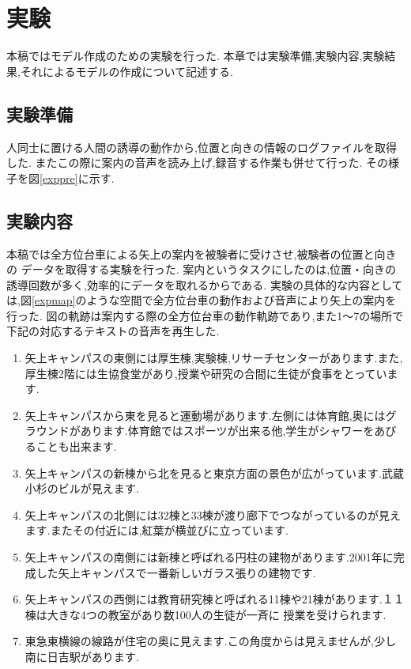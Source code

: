\chapter{実験}
本稿ではモデル作成のための実験を行った.
本章では実験準備,実験内容,実験結果,それによるモデルの作成について記述する.

\section{実験準備}
人同士に置ける人間の誘導の動作から,位置と向きの情報のログファイルを取得した.
またこの際に案内の音声を読み上げ,録音する作業も併せて行った.
その様子を図\ref{exppre}に示す.

\begin{comment}
\begin{figure}[!h]
\begin{center}
\texttt{[image: exppre.eps]}
\caption{実験準備の様子}
\label{exppre}
\end{center}
\end{figure}
\end{comment}

\section{実験内容}
本稿では全方位台車による矢上の案内を被験者に受けさせ,被験者の位置と向きの
データを取得する実験を行った.
案内というタスクにしたのは,位置・向きの誘導回数が多く,効率的にデータを取れるからである.
実験の具体的な内容としては,図\ref{expmap}のような空間で全方位台車の動作および音声により矢上の案内を行った.
図の軌跡は案内する際の全方位台車の動作軌跡であり,また1～7の場所で下記の対応するテキストの音声を再生した.

\begin{enumerate}
\item 矢上キャンパスの東側には厚生棟,実験棟,リサーチセンターがあります.また,厚生棟2階には生協食堂があり,授業や研究の合間に生徒が食事をとっています.
\item 矢上キャンパスから東を見ると運動場があります.左側には体育館,奥にはグラウンドがあります.体育館ではスポーツが出来る他,学生がシャワーをあびることも出来ます.
\item 
矢上キャンパスの新棟から北を見ると東京方面の景色が広がっています.武蔵小杉のビルが見えます.
\item 矢上キャンパスの北側には32棟と33棟が渡り廊下でつながっているのが見えます.またその付近には,紅葉が横並びに立っています.
\item 矢上キャンパスの南側には新棟と呼ばれる円柱の建物があります.2001年に完成した矢上キャンパスで一番新しいガラス張りの建物です.
\item 矢上キャンパスの西側には教育研究棟と呼ばれる11棟や21棟があります.１１棟は大きな4つの教室があり数100人の生徒が一斉に
授業を受けられます.
\item 東急東横線の線路が住宅の奥に見えます.この角度からは見えませんが,少し南に日吉駅があります.

\end{enumerate}

